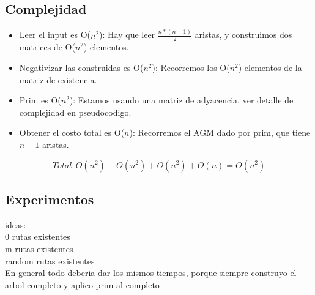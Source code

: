 \subsection{Complejidad}

\begin{itemize}
	\item Leer el input es O($n^2$): Hay que leer $\frac{n*(n-1)}{2}$ aristas, y construimos dos matrices de O($n^2$) elementos.
	\item Negativizar las construidas es O($n^2$): Recorremos los O($n^2$) elementos de la matriz de existencia.
	\item Prim es O($n^2$): Estamos usando una matriz de adyacencia, ver detalle de complejidad en pseudocodigo.
	\item Obtener el costo total es O($n$): Recorremos el AGM dado por prim, que tiene $n-1$ aristas.
\end{itemize}

$$Total:  O(n^2) + O(n^2) + O(n^2) + O(n) = O(n^2) $$

\subsection{Experimentos}

ideas:\\
0 rutas existentes\\
m rutas existentes\\
random rutas existentes\\

En general todo deberia dar los mismos tiempos, porque siempre construyo el arbol completo y aplico prim al completo